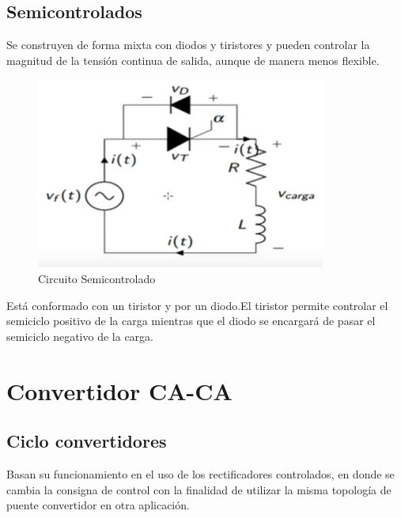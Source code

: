 \documentclass[12pt,a4paper]{article}
\begin{document}
\newpage
\subsection{Semicontrolados}
Se construyen de forma mixta con diodos y tiristores y pueden controlar la magnitud de la tensión continua de salida, aunque de manera menos flexible.\\

\begin{figure}[hbtp]
\centering
\includegraphics[scale=0.7]{Circuitos/3.png}
\caption{Circuito Semicontrolado}
\end{figure}
Está conformado con un tiristor y por un diodo.El tiristor permite controlar el semiciclo positivo de la carga mientras que el diodo se encargará de pasar el semiciclo negativo de la carga.

\section{Convertidor CA-CA}
\subsection{Ciclo convertidores}
Basan su funcionamiento en el uso de los rectificadores controlados, en donde se cambia la consigna de control con la finalidad de utilizar la misma topología de puente convertidor en otra aplicación. 
\end{document}
